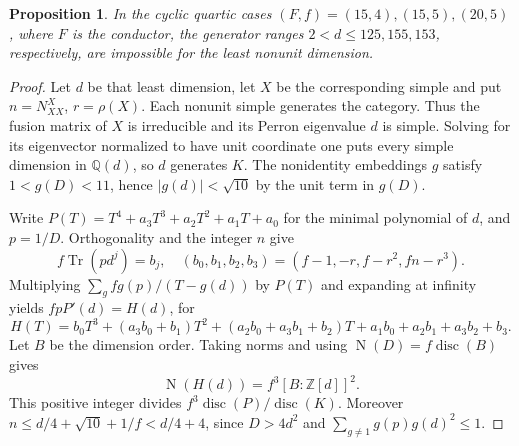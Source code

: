 \documentclass[11pt,a4paper]{article}
\newtheorem{proposition}[theorem]{Proposition}
\numberwithin{equation}{section}
\begin{document}
\begin{proposition}\label{prop:quartic-small-simple}
In the cyclic quartic cases $(F,f)=(15,4),(15,5),(20,5)$, where $F$ is the conductor, the generator ranges $2<d\le125,155,153$, respectively, are impossible for the least nonunit dimension.
\end{proposition}
\begin{proof}
Let $d$ be that least dimension, let $X$ be the corresponding simple and put $n=N_{XX}^X$, $r=\rho(X)$. Each nonunit simple generates the category. Thus the fusion matrix of $X$ is irreducible and its Perron eigenvalue $d$ is simple. Solving for its eigenvector normalized to have unit coordinate one puts every simple dimension in $\mathbb Q(d)$, so $d$ generates $K$. The nonidentity embeddings $g$ satisfy $1<g(D)<11$, hence $|g(d)|<\sqrt{10}$ by the unit term in $g(D)$.

Write $P(T)=T^4+a_3T^3+a_2T^2+a_1T+a_0$ for the minimal polynomial of $d$, and $p=1/D$. Orthogonality and the integer $n$ give
\[
 f\operatorname{Tr}(p d^j)=b_j,\quad
 (b_0,b_1,b_2,b_3)=(f-1,-r,f-r^2,fn-r^3).
\]
Multiplying $\sum_g f g(p)/(T-g(d))$ by $P(T)$ and expanding at infinity yields $fp P'(d)=H(d)$, for
\[
 H(T)=b_0T^3+(a_3b_0+b_1)T^2
 +(a_2b_0+a_3b_1+b_2)T+a_1b_0+a_2b_1+a_3b_2+b_3.
\]
Let $B$ be the dimension order. Taking norms and using $\operatorname N(D)=f\operatorname{disc}(B)$ gives
\[
 \operatorname N(H(d))=f^3[B:\mathbb Z[d]]^2.
\]
This positive integer divides $f^3\operatorname{disc}(P)/\operatorname{disc}(K)$. Moreover
$n\le d/4+\sqrt{10}+1/f<d/4+4$, since $D>4d^2$ and $\sum_{g\ne1}g(p)g(d)^2\le1$.


\end{proof}
\end{document}
